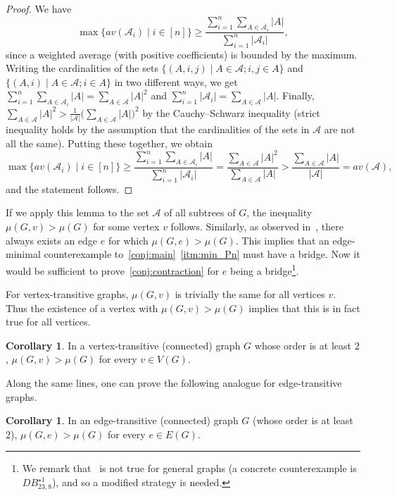 \documentclass[11pt]{article}
\theoremstyle{definition}
\newtheorem{cor}[thr]{Corollary}
\def\A{\mathcal{A}}
\newcommand*{\abs}[1]{\lvert #1\rvert}
\newcommand*{\av}{av}
\begin{document}
\begin{proof}
We have $$\max \{ \av(\A_i) \mid i \in [n]\} \ge \frac{ \sum_{i=1}^n \sum_{A\in \A_i} \abs A }{\sum_{i=1}^n \abs {\A_i} },$$
since a weighted average (with positive coefficients) is bounded by the maximum.
Writing the cardinalities of the sets $\{(A,i,j)\mid A \in \A; i,j \in A \}$ and $\{(A,i)\mid A \in \A; i \in A \}$ in two different ways, we get
$\sum_{i=1}^n \sum_{A\in \A_i} \abs A = \sum_{A\in \A} \abs A ^2$ and $\sum_{i=1}^n \abs {\A_i} = \sum_{A\in \A} \abs A$. Finally, $\sum_{A\in \A} \abs A ^2 > \frac{1}{\abs \A} \big( \sum_{A\in \A} \abs A \big)^2$ by the Cauchy--Schwarz inequality (strict inequality holds by the assumption that the cardinalities of the sets in $\A$ are not all the same). Putting these together, we obtain
$$\max \{ \av(\A_i) \mid i \in [n]\} \ge \frac{ \sum_{i=1}^n \sum_{A\in \A_i} \abs A }{\sum_{i=1}^n \abs {\A_i} } 
 = \frac{ \sum_{A\in \A} \abs A ^2 }{ \sum_{A\in \A} \abs A} > \frac{\sum_{A\in \A} \abs A }{\abs \A} = \av(\A),$$
 and the statement follows.
\end{proof}
If we apply this lemma to the set $\A$ of all subtrees of $G$, the inequality $\mu(G,v) > \mu(G)$ for some vertex $v$ follows. Similarly, as observed in~\cite{CM21}, there always exists an edge $e$ for which $\mu(G,e)>\mu(G)$.
This implies that an edge-minimal counterexample to~\cref{conj:main}~\ref{itm:min_Pn} must have a bridge.
Now it would be sufficient to prove~\cref{conj:contraction} for $e$ being a bridge\footnote{We remark that~\cite[Eq.~(2.7)]{Ruoyu24} is not true for general graphs (a concrete counterexample is $DB^{\star 1}_{23,8}$), and so a modified strategy is needed.}.

For vertex-transitive graphs, $\mu(G,v)$ is trivially the same for all vertices $v$. Thus the existence of a vertex with $\mu(G,v) > \mu(G)$ implies that this is in fact true for all vertices.

\begin{cor}\label{cor:VT_muv>mu}
    In a vertex-transitive (connected) graph $G$ whose order is at least $2$, $\mu(G,v)> \mu(G)$ for every $v \in V(G)$.
\end{cor}
Along the same lines, one can prove the following analogue for edge-transitive graphs.

\begin{cor}\label{cor:ET_mue>mu}
    In an edge-transitive (connected) graph $G$ (whose order is at least $2$), $\mu(G,e)> \mu(G)$ for every $e \in E(G)$.
\end{cor}
\end{document}
